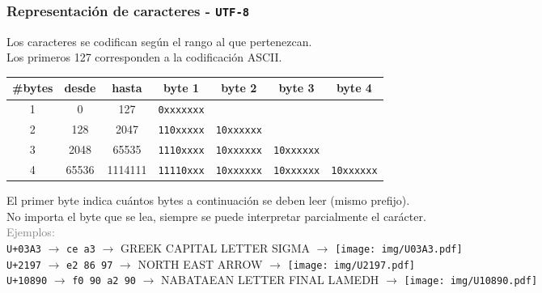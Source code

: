\documentclass[aspectratio=169]{beamer}
\begin{document}
\begin{frame}[fragile,t]
    \frametitle{Representación de caracteres - \texttt{UTF-8}}
    Los caracteres se codifican según el rango al que pertenezcan.\\
    Los primeros 127 corresponden a la codificación ASCII.\\
    \begin{center}
    \begin{tabular}{|c|c|c|c|c|c|c|} \hline
    \rowcolor{blue!50}
    \#bytes & desde & hasta & byte 1 & byte 2 & byte 3 & byte 4 \\ \hline
    1 & \cellcolor{gray!25}0 & \cellcolor{gray!25}127 &  \texttt{0xxxxxxx} & \cellcolor{blue!25} & \cellcolor{blue!25} & \cellcolor{blue!25} \\ \hline
    2 & \cellcolor{gray!25}128 & \cellcolor{gray!25}2047 & \texttt{110xxxxx} & \texttt{10xxxxxx} & \cellcolor{blue!25} & \cellcolor{blue!25} \\ \hline
    3 & \cellcolor{gray!25}2048 & \cellcolor{gray!25}65535 & \texttt{1110xxxx} & \texttt{10xxxxxx} & \texttt{10xxxxxx} & \cellcolor{blue!25} \\ \hline
    4 & \cellcolor{gray!25}65536 & \cellcolor{gray!25}1114111 & \texttt{11110xxx} & \texttt{10xxxxxx} & \texttt{10xxxxxx} & \texttt{10xxxxxx} \\ \hline
    \end{tabular}
    \end{center}
    El primer byte indica cuántos bytes a continuación se deben leer (mismo prefijo).\\
    No importa el byte que se lea, siempre se puede interpretar parcialmente el carácter.\\
    \textcolor{gray}{Ejemplos:}\\
    \hspace{1cm} \texttt{U+03A3} $\rightarrow$ \texttt{ce a3} $\rightarrow$ {\scriptsize GREEK CAPITAL LETTER SIGMA} $\rightarrow$
    \texttt{[image: img/U03A3.pdf]}\\
    \hspace{1cm} \texttt{U+2197} $\rightarrow$ \texttt{e2 86 97} $\rightarrow$ {\scriptsize NORTH EAST ARROW} $\rightarrow$
    \texttt{[image: img/U2197.pdf]}\\
    \hspace{1cm} \texttt{U+10890} $\rightarrow$ \texttt{f0 90 a2 90} $\rightarrow$ {\scriptsize NABATAEAN LETTER FINAL LAMEDH} $\rightarrow$
    \texttt{[image: img/U10890.pdf]}
\end{frame}
\end{document}
